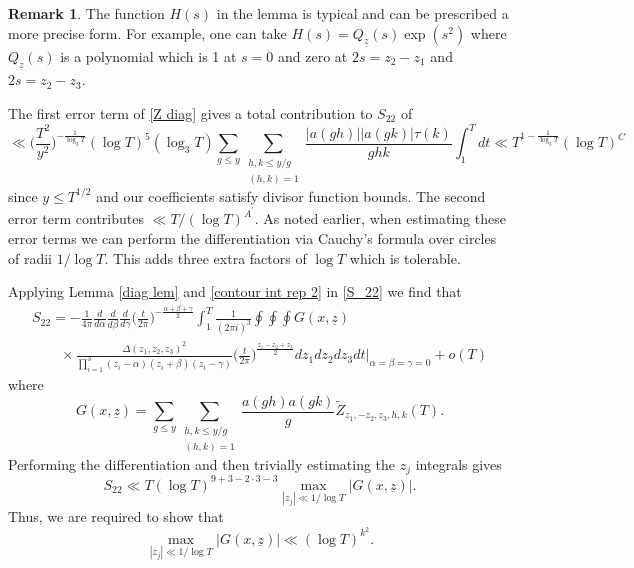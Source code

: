 \documentclass[oneside, 12pt]{amsart}
\theoremstyle{definition}
\newtheorem*{rem}{Remark}
\newcommand{\ul}{\underline}
\newcommand{\leqs}{\leqslant }
\begin{document}

\begin{rem}
The function $H(s)$ in the lemma is typical and can be prescribed a more precise form. For example, one can take $H(s)=Q_{\ul{z}}(s)\exp(s^2)$ where $Q_{\ul{z}}(s)$ is a polynomial which is 1 at $s=0$ and zero at $2s=z_2-z_1$ and $2s=z_2-z_3$.
\end{rem}
The first error term of \eqref{Z diag} gives a total contribution to $S_{22}$ of
\[
\ll\Big(\frac{T^2}{y^2}\Big)^{-\frac{1}{\log_3 T}}(\log T)^5(\log_3 T)\sum_{g\leqs y}\sum_{\substack{h,k\leqs y/g\\(h,k)=1}}\frac{|a(gh)||a(gk)|\tau(k)}{ghk}\int_1^T dt\ll T^{1-\frac{1}{\log_3 T}}(\log T)^C
\]
since $y\leqs T^{1/2}$ and our coefficients satisfy divisor function bounds. The second error term contributes $\ll T/(\log T)^{A^\prime}$. As noted earlier, when estimating these error terms we can perform the differentiation via Cauchy's formula over circles of radii $1/\log T$. This adds three extra factors of $\log T$ which is tolerable.

Applying Lemma \ref{diag lem} and \eqref{contour int rep 2} in \eqref{S_22} we find that 
\begin{multline*}
S_{22} = -\frac{1}{4\pi}\frac{d}{d\alpha}\frac{d}{d\beta}  \frac{d}{d\gamma} 
                 \bigg(\frac{t}{2\pi}\bigg)^{-\frac{\alpha+\beta+\gamma}{2}}
                 \int_1^T
                 \frac{1}{(2\pi i)^3}\oint\!\!\!\oint\!\!\!\oint 
                 G(x,\underline{z})
        \\      \qquad   \times 
                 \frac{\Delta(z_1,z_2,z_3)^2}{\prod_{i=1}^3(z_i-\alpha)(z_i+\beta)(z_i-\gamma)}
                 \bigg(\frac{t}{2\pi}\bigg)^{\frac{z_1-z_2+z_3}{2}}dz_1dz_2dz_3dt
                 \bigg|_{\alpha=\beta=\gamma=0}
+o(T)
\end{multline*}
where 
\[
G(x,\underline{z}) 
=
 \sum_{g\leqs y}\sum_{\substack{h,k\leqs y/g\\(h,k)=1}}\frac{a(gh)a(gk)}{g}\tilde{Z}_{z_1,-z_2,z_3,h,k}(T).
\]
Performing the differentiation and then trivially estimating the $z_j$ integrals gives
\[
S_{22}\ll T (\log T)^{9+3-2\cdot 3-3}\max_{|z_j|\ll1/\log T}|G(x,\ul{z})|.
\]
Thus, we are required to show that 
\begin{equation}
\label{G bound}
\max_{|z_j|\ll1/\log T}|G(x,\ul{z})|\ll (\log T)^{k^2}.
\end{equation}
\end{document}
